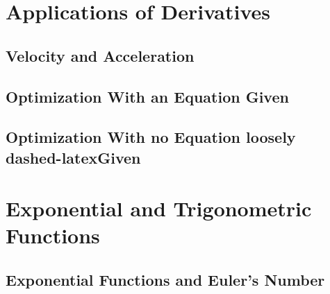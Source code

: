 \documentclass[12pt]{article}
\begin{document}
    \section{Applications of Derivatives}
        \subsection{Velocity and Acceleration}
        \subsection{Optimization With an Equation Given}
        \subsection{Optimization With no Equation loosely dashed-latexGiven}

    \section{Exponential and Trigonometric Functions}
    \subsection{Exponential Functions and Euler's Number}
\end{document}
